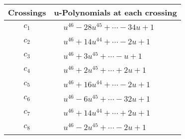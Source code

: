 \documentclass[1p]{elsarticle_modified}
\theoremstyle{definition}
\begin{document}
\begin{tabular}{m{50pt}|m{274pt}}
Crossings & \hspace{64pt}u-Polynomials at each crossing \\
\hline $$\begin{aligned}c_{1}\end{aligned}$$&$\begin{aligned}
&u^{46}-28 u^{45}+\cdots-34 u+1
\end{aligned}$\\
\hline $$\begin{aligned}c_{2}\end{aligned}$$&$\begin{aligned}
&u^{46}+14 u^{44}+\cdots-2 u+1
\end{aligned}$\\
\hline $$\begin{aligned}c_{3}\end{aligned}$$&$\begin{aligned}
&u^{46}+3 u^{45}+\cdots- u+1
\end{aligned}$\\
\hline $$\begin{aligned}c_{4}\end{aligned}$$&$\begin{aligned}
&u^{46}+2 u^{45}+\cdots+2 u+1
\end{aligned}$\\
\hline $$\begin{aligned}c_{5}\end{aligned}$$&$\begin{aligned}
&u^{46}+16 u^{44}+\cdots-2 u+1
\end{aligned}$\\
\hline $$\begin{aligned}c_{6}\end{aligned}$$&$\begin{aligned}
&u^{46}-6 u^{45}+\cdots-32 u+1
\end{aligned}$\\
\hline $$\begin{aligned}c_{7}\end{aligned}$$&$\begin{aligned}
&u^{46}+14 u^{44}+\cdots+2 u+1
\end{aligned}$\\
\hline $$\begin{aligned}c_{8}\end{aligned}$$&$\begin{aligned}
&u^{46}-2 u^{45}+\cdots-2 u+1
\end{aligned}$\\

\end{tabular}
\end{document}
